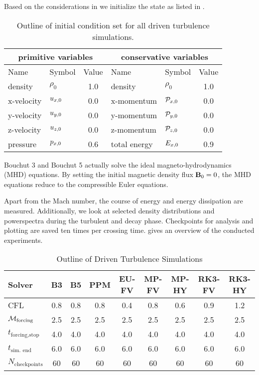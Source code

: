 Based on the considerations in  we initialize the state
as listed in . 
\begin{table}[H]
\caption{Outline of initial condition set for all driven turbulence simulations.}
\centering
\begin{tabular}{llc|llc}
\toprule
\multicolumn{3}{c}{primitive variables} &
\multicolumn{3}{c}{conservative variables} \\
\midrule
Name & Symbol & Value & Name & Symbol & Value\\
\midrule
density         & $\rho_0$            & 1.0 & density         & $\rho_0$            & 1.0 \\ 
x-velocity      & $u_{x,0}$       & 0.0 & x-momentum      & $\mathcal{P}_{x,0}$           & 0.0 \\ 
y-velocity      & $u_{y,0}$       & 0.0 & y-momentum      & $\mathcal{P}_{y,0}$           & 0.0 \\ 
z-velocity      & $u_{z,0}$       & 0.0 & z-momentum      & $\mathcal{P}_{z,0}$           & 0.0 \\  
pressure        & $p_{x,0}$       & 0.6 & total energy    & $E_{x,0}$       & 0.9 \\  
\bottomrule
\end{tabular}
\label{tab:initial-state}
\end{table}\remark Bouchut 3 and Bouchut 5 actually solve the ideal
magneto-hydrodynamics (MHD) equations. By setting the initial magnetic density
flux $\mathbf{B}_0 = 0$, the MHD equations reduce to the compressible Euler
equations. 

Apart from the Mach number, the course of energy and energy dissipation
are measured. Additionally, we look at selected density distributions and
powerspectra during the turbulent and decay phase. Checkpoints for analysis and
plotting are saved ten times per crossing time.  gives an
overview of the conducted experiments.
\begin{table}[H]
\caption{Outline of Driven Turbulence Simulations}
\centering
\begin{tabular}{l| cccc cccc}
\toprule
Solver                      & B3 & B5 & PPM & EU-FV & MP-FV & MP-HY & RK3-FV & RK3-HY \\
\midrule
CFL                         & 0.8 & 0.8 & 0.8 & 0.4 & 0.8 & 0.6 & 0.9 & 1.2 \\
$\mathcal{M}_{\text{forcing}}$    & 2.5 & 2.5 & 2.5 & 2.5 & 2.5 & 2.5 & 2.5 & 2.5 \\
$t_{\text{forcing,stop}}$   & 4.0 & 4.0 & 4.0 & 4.0 & 4.0 & 4.0 & 4.0 & 4.0 \\
$t_{\text{sim. end}}$       & 6.0 & 6.0 & 6.0 & 6.0 & 6.0 & 6.0 & 6.0 & 6.0 \\
$N_{\text{checkpoints}}$    & 60 & 60 & 60 & 60 & 60 & 60 & 60 & 60 \\
\bottomrule
\end{tabular}
\label{tab:setup-stirturb}
\end{table}

